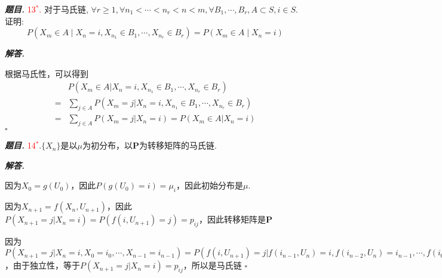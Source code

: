 \documentclass[10pt, a4paper, oneside]{ctexart}
\newenvironment{problem}{\begin{framed}\par\noindent\textbf{\textit{题目. }}}{\end{framed}\par}
\newenvironment{solution}{%
  \par\noindent\textbf{\textit{解答. }}\ignorespaces
}{%
  \hfill\ensuremath{\square}\par %
}
\begin{document}
\begin{problem}\textcolor{red}{13$^*$.} 对于马氏链, $\forall r\geq 1,\forall {n}_{1} < \cdots  < {n}_{r} < n < m,\forall {B}_{1},\cdots ,{B}_{r},A\subset S, i\in S$. 证明:  
$$P\left( {{X}_{m} \in  A \mid  {X}_{n} = i,{X}_{{n}_{1}} \in  {B}_{1},\cdots ,{X}_{{n}_{r}} \in  {B}_{r}}\right)  = P\left( {{X}_{m} \in  A \mid  {X}_{n} = i}\right)$$  
\end{problem}
\begin{solution}
    根据马氏性，可以得到
    \begin{align*}
&P(X_m\in A| X_n=i,X_{n_1}\in B_1,\cdots,X_{n_r}\in B_r)\\
=&\sum_{j\in A}P(X_m=j| X_n=i,X_{n_1}\in B_1,\cdots,X_{n_r}\in B_r)\\
=&\sum_{j\in A}P(X_m=j| X_n=i)=P(X_m\in A|X_n=i)
    \end{align*}
\end{solution}

\begin{problem}
\textcolor{red}{14$^*$}$ . \{X_n\}$是以$\mu$为初分布，以$\bm{P}$为转移矩阵的马氏链.
\end{problem}

\begin{solution}
 因为$X_0=g(U_0)$，因此$P(g(U_0)=i)=\mu_i$，因此初始分布是$\mu$.

 因为$X_{n+1}=f(X_n,U_{n+1})$，因此$P(X_{n+1}=j|X_{n}=i)=P(f(i,U_{n+1})=j)=p_{ij}$，因此转移矩阵是$\bm{P}$

 因为$P(X_{n+1}=j|X_{n}=i,X_{0}=i_0,\cdots,X_{n-1}=i_{n-1})=P(f(i,U_{n+1})=j|f(i_{n-1},U_{n})=i,f(i_{n-2},U_{n})=i_{n-1},\cdots,f(i_0,U_{1})=i_1,g(U_0)=i_0)$，由于独立性，等于$P(X_{n+1}=j|X_n=i)=p_{ij}$，所以是马氏链
\end{solution}
\end{document}
